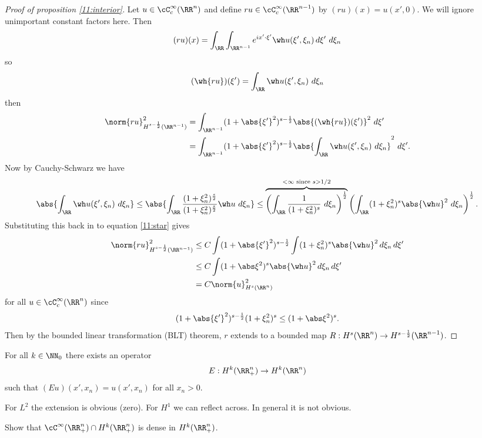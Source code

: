 \begin{proof}[Proof of proposition \ref{11:interior}]
  Let $u\in\cC_c^\infty(\RR^n)$ and define $ru\in\cC_c^\infty(\RR^{n-1})$ by $(ru)(x)=u(x',0)$.
  We will ignore unimportant constant factors here.
  Then
  \[ (ru)(x) = \int_\RR \int_{\RR^{n-1}} e^{ix'\cdot\xi'} \wh u(\xi',\xi_n) \, d\xi' \ d\xi_n \]
  so
  \[ (\wh{ru})(\xi') = \int_\RR \wh u(\xi',\xi_n) \ d\xi_n \]
  then
  \begin{align}
    \norm{ru}_{H^{s-\frac12}(\RR^{n-1})}^2 &= \int_{\RR^{n-1}} (1+\abs{\xi'}^2)^{s-\frac12} \abs{(\wh{ru})(\xi')}^2 \ d\xi' \nonumber \\
    &= \int_{\RR^{n-1}} (1+\abs{\xi'}^2)^{s-\frac12} \abs{\int_\RR \wh u(\xi',\xi_n) \ d\xi_n}^2 \ d\xi'. \label{11:star}
  \end{align}
  Now by Cauchy-Schwarz we have\vspace{-0.5cm}
  \[ \abs{\int_\RR \wh u(\xi',\xi_n) \ d\xi_n} \leq \abs{\int_\RR\frac{(1+\xi_n^2)^\frac s2}{(1+\xi_n^2)^\frac s2} \wh u \ d\xi_n} \leq \overbrace{\left( \int_\RR \frac{1}{(1+\xi_n^2)^s} \ d\xi_n \right)^\frac12}^{<\infty \text{ since } s>1/2} \left( \int_\RR (1+\xi_n^2)^s \abs{\wh u}^2 \ d\xi_n \right)^\frac12. \]
  Substituting this back in to equation \ref{11:star} gives
  \begin{align*}
    \norm{ru}_{H^{s-\frac12}(\RR^{n-1})}^2 &\leq C \int (1+\abs{\xi'}^2)^{s-\frac12} \int (1+\xi_n^2)^s \abs{\wh u}^2 \, d\xi_n \, d\xi' \\
    &\leq C \int (1+\abs\xi^2)^s \abs{\wh u}^2 \, d\xi_n \, d\xi' \\
    &= C\norm{u}_{H^s(\RR^n)}^2
  \end{align*}
  for all $u\in\cC_c^\infty(\RR^n)$ since
  \[ (1+\abs{\xi'}^2)^{s-\frac12}(1+\xi_n^2)^s \leq (1+\abs\xi^2)^s. \]
  Then by the bounded linear transformation (BLT) theorem, $r$ extends to a bounded map $R: H^s(\RR^n) \to H^{s-\frac12}(\RR^{n-1})$.
\end{proof}

\begin{prop}\label{11:extension}
  For all $k\in\NN_0$ there exists an operator
  \[ E: H^k(\RR_+^n) \to H^k(\RR^n) \]
  such that $(Eu)(x',x_n)=u(x',x_n)$ for all $x_n>0$.
\end{prop}

For $L^2$ the extension is obvious (zero).
For $H^1$ we can reflect across.
In general it is not obvious.

\begin{exer}
  Show that $\cC^\infty(\RR_+^n) \cap H^k(\RR_+^n)$ is dense in $H^k(\RR_+^n)$.
\end{exer}

